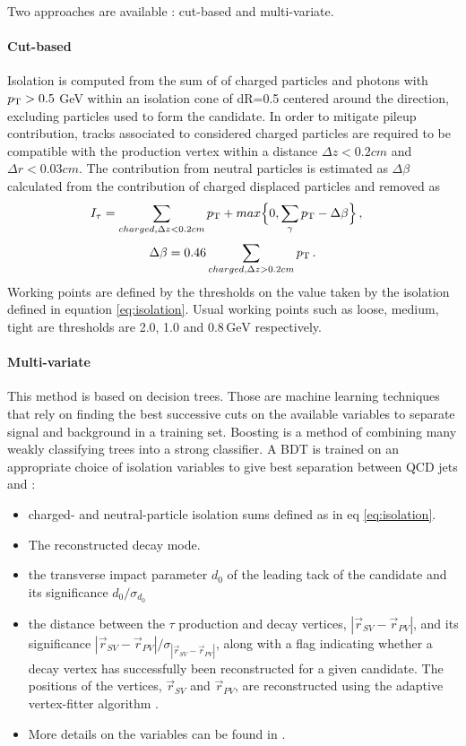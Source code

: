Two approaches are available : cut-based and multi-variate.

\paragraph{Cut-based} Isolation is computed from the sum of \pt of charged particles and photons with $p_{\mathrm{T}} > 0.5$ GeV within an isolation cone of dR=0.5 centered around the \tauh direction, excluding particles used to form the \tauh candidate. In order to mitigate pileup contribution, tracks associated to considered charged particles are required to be compatible with the \tauh production vertex within a distance $\Delta z < 0.2 cm$ and $\Delta r < 0.03 cm$. The contribution from neutral particles is estimated as $\Delta \beta$ calculated from the contribution of charged displaced particles and removed as
\begin{equation}
    I_{\tau} = \sum_{charged, \Delta z<0.2 cm} \pt + max \Big\{ 0, \sum_{\gamma} \pt - \Delta\beta \Big\} \msep
    \label{eq:isolation}
\end{equation}
\begin{equation}
    \Delta \beta = 0.46 \sum_{charged,\Delta z>0.2 cm} \pt \mend
\end{equation}
Working points are defined by the thresholds on the value taken by the isolation defined in equation \ref{eq:isolation}. Usual working points such as loose, medium, tight are thresholds are 2.0, 1.0 and $0.8\,\mathrm{GeV}$ respectively.

\paragraph{Multi-variate} This method is based on decision trees. Those are machine learning techniques that rely on finding the best successive cuts on the available variables to separate signal and background in a training set. Boosting is a method of combining many weakly classifying trees into a strong classifier. A BDT is trained on an appropriate choice of isolation variables to give best separation between QCD jets and \tauh : 
    \begin{itemize}
        \item charged- and neutral-particle isolation sums defined as in eq \ref{eq:isolation}.
        \item The reconstructed decay mode.
        \item the transverse impact parameter $d_0$ of the leading tack of the \tauh candidate and its significance $d_0 / \sigma_{d_0}$
        \item the distance between the $\tau$ production and decay vertices, $|\Vec{r}_{SV} - \Vec{r}_{PV}|$, and its significance $|\Vec{r}_{SV} - \Vec{r}_{PV}|/\sigma_{|\Vec{r}_{SV} - \Vec{r}_{PV}|}$, along with a flag indicating whether a decay vertex has successfully been reconstructed for a given \tauh candidate. The positions of the vertices, $\Vec{r}_{SV}$ and $\Vec{r}_{PV}$, are reconstructed using the adaptive vertex-fitter algorithm \cite{Waltenberger_2007}.
        \item More details on the variables can be found in \cite{tauh_reconstruction}.
    \end{itemize}

